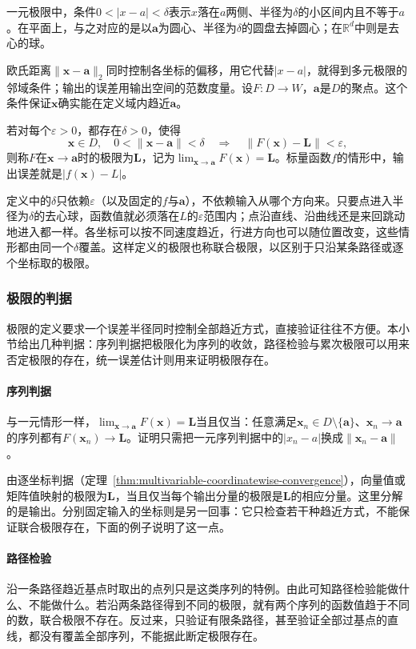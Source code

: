 一元极限中，条件$0<|x-a|<\delta$表示$x$落在$a$两侧、半径为$\delta$的小区间内且不等于$a$。在平面上，与之对应的是以$\bm a$为圆心、半径为$\delta$的圆盘去掉圆心；在$\mathbb R^d$中则是去心的球。

欧氏距离$\lVert\bm x-\bm a\rVert_2$同时控制各坐标的偏移，用它代替$|x-a|$，就得到多元极限的邻域条件；输出的误差用输出空间的范数度量。设$F:D\to W$，$\bm a$是$D$的聚点。这个条件保证$\bm x$确实能在定义域内趋近$\bm a$。
\begin{definition}[映射的极限]
\label{def:multivariable-limit}
若对每个$\varepsilon>0$，都存在$\delta>0$，使得
\[
 \bm x\in D,\quad 0<\lVert\bm x-\bm a\rVert<\delta
 \quad\Longrightarrow\quad \lVert F(\bm x)-\bm L\rVert<\varepsilon,
\]
则称$F$在$\bm x\to\bm a$时的极限为$\bm L$，记为$\lim_{\bm x\to\bm a}F(\bm x)=\bm L$。标量函数$f$的情形中，输出误差就是$|f(\bm x)-L|$。
\end{definition}
定义中的$\delta$只依赖$\varepsilon$（以及固定的$f$与$\bm a$），不依赖输入从哪个方向来。只要点进入半径为$\delta$的去心球，函数值就必须落在$L$的$\varepsilon$范围内；点沿直线、沿曲线还是来回跳动地进入都一样。各坐标可以按不同速度趋近，行进方向也可以随位置改变，这些情形都由同一个$\delta$覆盖。这样定义的极限也称联合极限，以区别于只沿某条路径或逐个坐标取的极限。

\subsubsection{极限的判据}
\label{sec:multivariable-limit-criteria}

极限的定义要求一个误差半径同时控制全部趋近方式，直接验证往往不方便。本小节给出几种判据：序列判据把极限化为序列的收敛，路径检验与累次极限可以用来否定极限的存在，统一误差估计则用来证明极限存在。

\paragraph{序列判据}
与一元情形一样，$\lim_{\bm x\to\bm a}F(\bm x)=\bm L$当且仅当：任意满足$\bm x_n\in D\setminus\{\bm a\}$、$\bm x_n\to\bm a$的序列都有$F(\bm x_n)\to\bm L$。证明只需把一元序列判据中的$|x_n-a|$换成$\lVert\bm x_n-\bm a\rVert$。

由逐坐标判据（定理~\ref{thm:multivariable-coordinatewise-convergence}），向量值或矩阵值映射的极限为$\bm L$，当且仅当每个输出分量的极限是$\bm L$的相应分量。这里分解的是输出。分别固定输入的坐标则是另一回事：它只检查若干种趋近方式，不能保证联合极限存在，下面的例子说明了这一点。

\paragraph{路径检验}
沿一条路径趋近基点时取出的点列只是这类序列的特例。由此可知路径检验能做什么、不能做什么。若沿两条路径得到不同的极限，就有两个序列的函数值趋于不同的数，联合极限不存在。反过来，只验证有限条路径，甚至验证全部过基点的直线，都没有覆盖全部序列，不能据此断定极限存在。


